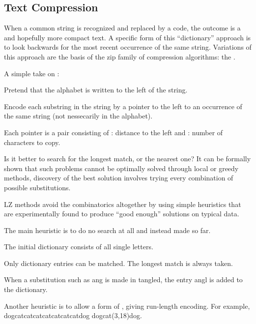 \subsection{Text Compression}
When a common string is recognized and replaced by a code, the
outcome is a  and hopefully more compact text.
A specific form of this “dictionary” approach is to look backwards for the
most recent occurrence of the same string. Variations of this approach
are the basis of the zip family of compression algorithms: the .

\begin{A}
A simple take on : \begin{compactitem}
\item Pretend that the alphabet is written to the left of the string.
\item Encode each substring in the string by a pointer to the left to an
occurrence of the same string (not nessecarily in the alphabet).
\item Each pointer is a pair consisting of : distance to the left and :
number of characters to copy.
\end{compactitem}
\end{A}

Is it better to search for the longest
match, or the nearest one?
It can be formally shown that such problems cannot be optimally solved
through local or greedy methods, discovery of the best solution involves trying every combination
of possible substitutions. 

LZ methods avoid the combinatorics altogether by using simple
heuristics that are experimentally found to produce “good enough”
solutions on typical data.
\begin{A}
The main heuristic is to do no search at all and instead  made so far.
\begin{compactitem}
\item The initial dictionary consists of all single letters.
\item Only dictionary entries can be matched. The longest match is
always taken.
\item When a substitution such as ang is made in tangled, the entry
angl is added to the dictionary.
\end{compactitem}
\end{A}

Another heuristic is to allow a form of , giving
run-length encoding. For example,
dogcatcatcatcatcatcatcatdog
dogcat(3,18)dog.

